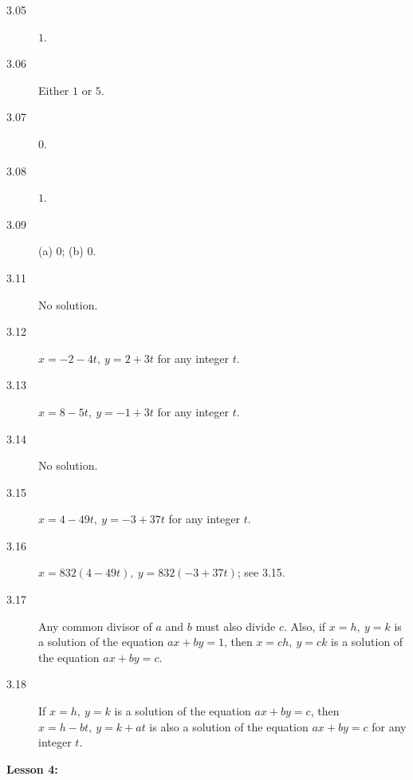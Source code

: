 \documentclass{article}
\begin{document}
\begin{description}
  \item[3.05] $1$.
  \item[3.06] Either $1$ or $5$. 
  \item[3.07] $0$.
  \item[3.08] $1$.
  \item[3.09] (a) $0$; (b) $0$. 
  \item[3.11] No solution.
  \item[3.12] $x=-2-4t,\ y=2+3t$ for any integer $t$.
  \item[3.13] $x=8-5t,\ y=-1+3t$ for any integer $t$. 
  \item[3.14] No solution. 
  \item[3.15] $x=4-49t,\ y=-3+37t$ for any integer $t$.
  \item[3.16] $x=832(4-49t),\ y=832(-3+37t)$; see 3.15.
  \item[3.17] Any common divisor of $a$ and $b$ must also divide $c$. Also, if $x=h,\ y=k$ is a solution of the equation $ax+by=1$, then $x=ch,\ y=ck$ is a solution of the equation $ax+by=c$.
  \item[3.18] If $x=h,\ y=k$ is a solution of the equation $ax+by=c$, then $x=h-bt,\ y=k+at$ is also a solution of the equation $ax+by=c$ for any integer $t$.
\end{description}
\vspace{0.3cm}

\textbf{Lesson 4:}
\end{document}
